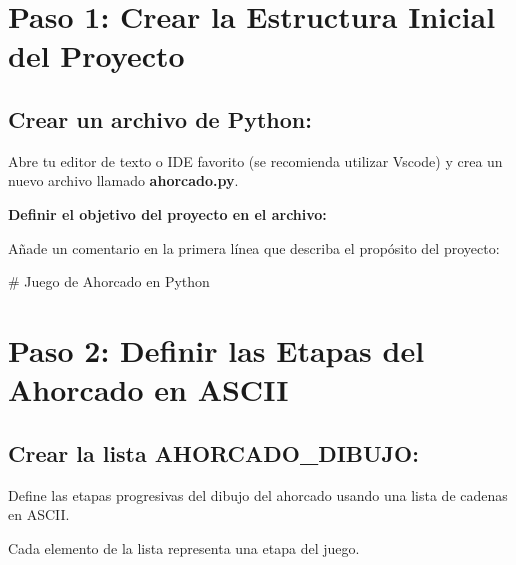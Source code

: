 \documentclass[
  a4paper,
  DIV=11,
  numbers=noendperiod,
  onepage,
  openany]{scrreprt}
\newenvironment{Shaded}{\begin{snugshade}}{\end{snugshade}}
\newcommand{\CommentTok}[1]{\textcolor[rgb]{0.37,0.37,0.37}{#1}}
\begin{document}
\section{Paso 1: Crear la Estructura Inicial del
Proyecto}\label{paso-1-crear-la-estructura-inicial-del-proyecto}

\subsection{Crear un archivo de
Python:}\label{crear-un-archivo-de-python}

Abre tu editor de texto o IDE favorito (se recomienda utilizar Vscode) y
crea un nuevo archivo llamado \textbf{ahorcado.py}.

\textbf{Definir el objetivo del proyecto en el archivo:}

Añade un comentario en la primera línea que describa el propósito del
proyecto:

\begin{Shaded}
\begin{Highlighting}[]
\CommentTok{\# Juego de Ahorcado en Python}
\end{Highlighting}
\end{Shaded}

\section{Paso 2: Definir las Etapas del Ahorcado en
ASCII}\label{paso-2-definir-las-etapas-del-ahorcado-en-ascii}

\subsection{Crear la lista
AHORCADO\_DIBUJO:}\label{crear-la-lista-ahorcado_dibujo}

Define las etapas progresivas del dibujo del ahorcado usando una lista
de cadenas en ASCII.

Cada elemento de la lista representa una etapa del juego.
\end{document}
